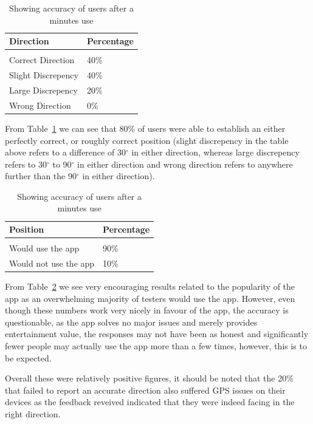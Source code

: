 \documentclass[12pt]{article} %
\begin{document}
\begin{table}[h]
\begin{center}
\begin{tabular}{p{} p{}}
Direction & Percentage \\
\hline\\
Correct Direction & 40\% \\
Slight Discrepency & 40\% \\
Large Discrepency & 20\% \\
Wrong Direction & 0\% \\
\end{tabular}
\caption{Showing accuracy of users after a minutes use}
\label{UserTestResults}
\end{center}
\end{table}

From Table~\ref{UserTestResults} we can see that 80\% of users were able to establish an either
perfectly correct, or roughly correct position (slight discrepency in the table above refers to a
difference of 30$^\circ$ in either direction, whereas large discrepency refers to 30$^\circ$ to
90$^\circ$ in either direction and wrong direction refers to anywhere further than the 90$^\circ$ in
either direction).

\begin{table}[h]
\begin{center}
\begin{tabular}{p{} p{}}
Position & Percentage \\
\hline \\
Would use the app & 90\% \\
Would not use the app & 10\% \\
\end{tabular}
\caption{Showing accuracy of users after a minutes use}
\label{UserTestUse}
\end{center}
\end{table}

From Table~\ref{UserTestUse} we see very encouraging results related to the popularity of the app
as an overwhelming majority of testers would use the app. However, even though these numbers work
very nicely in favour of the app, the accuracy is questionable, as the app solves no major issues
and merely provides entertainment value, the responses may not have been as honest and
significantly fewer people may actually use the app more than a few times, however, this is to be
expected. 

Overall these were relatively positive figures, it should be noted that the 20\% that failed to
report an accurate direction also suffered GPS issues on their devices as the feedback reveived
indicated that they were indeed facing in the right direction.
\end{document}
